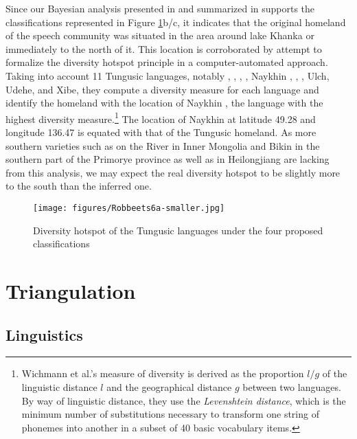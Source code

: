 \documentclass[output=paper,colorlinks,citecolor=brown]{langscibook}
\begin{document}
Since our Bayesian analysis presented in \citet{Oskolskayaetal2022} and summarized in  supports the classifications represented in Figure \ref{fig:8:6}b/c, it indicates that the original homeland of the  speech community was situated in the area around lake Khanka or immediately to the north of it. This location is corroborated by  attempt to formalize the diversity hotspot principle in a computer-automated approach. Taking into account 11 Tungusic languages, notably , , , , Naykhin , , , Ulch, Udehe,  and Xibe, they compute a diversity measure for each language and identify the homeland with the location of Naykhin , the language with the highest diversity measure.\footnote{Wichmann et al.'s measure of diversity is derived as the proportion $l/g$ of the linguistic distance $l$ and the geographical distance $g$ between two languages. By way of linguistic distance, they use the \textit{Levenshtein distance}, which is the minimum number of substitutions necessary to transform one string of phonemes into another in a subset of 40 basic vocabulary items.} The location of Naykhin  at latitude 49.28 and longitude 136.47 is equated with that of the Tungusic homeland. As more southern varieties such as  on the  River in Inner Mongolia and Bikin  in the southern part of the Primorye province as well as  in Heilongjiang are lacking from this analysis, we may expect the real diversity hotspot to be slightly more to the south than the inferred one.

\begin{figure}
\texttt{[image: figures/Robbeets6a-smaller.jpg]}
\caption{Diversity hotspot of the Tungusic languages under the four proposed classifications}
\label{fig:8:6}
\end{figure}


\section{Triangulation}\label{Section8.5}

\subsection{Linguistics}\label{Section8.5.1}
\end{document}
